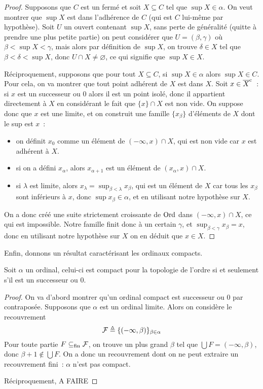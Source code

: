 \begin{proof}
  Supposons que $C$ est un fermé et soit $X\subseteq C$ tel que
  $\sup X \in \alpha$. On veut montrer que $\sup X$ est dans l'adhérence de $C$
  (qui est $C$ lui-même par hypothèse). Soit $U$ un ouvert contenant
  $\sup X$, sans perte de généralité (quitte à prendre une plus petite partie)
  on peut considérer que $U = (\beta, \gamma)$ où $\beta < \sup X < \gamma$,
  mais alors par définition de $\sup X$, on trouve $\delta \in X$ tel que
  $\beta < \delta < \sup X$, donc $U \cap X \neq\varnothing$, ce qui signifie
  que $\sup X \in X$.

  Réciproquement, supposons que pour tout $X\subseteq C$, si $\sup X \in \alpha$
  alors $\sup X \in C$. Pour cela, on va montrer que tout point adhérent de
  $X$ est dans $X$. Soit $x \in \overline{X}^{\mathrm c}$~: si $x$ est un successeur ou $0$
  alors il est un point isolé, donc il appartient directement à $X$ en
  considérant le fait que $\{x\}\cap X$ est non vide. On suppose donc que
  $x$ est une limite, et on construit une famille $\{x_\beta\}$ d'éléments de
  $X$ dont le sup est $x$~:
  \begin{itemize}
  \item on définit $x_0$ comme un élément de $(-\infty, x)\cap X$, qui est non
    vide car $x$ est adhérent à $X$.
  \item si on a défini $x_\alpha$, alors $x_{\alpha + 1}$ est un élément de
    $(x_\alpha,x)\cap X$.
  \item si $\lambda$ est limite, alors
    $x_{\lambda}=\sup_{\beta < \lambda}x_\beta$, qui est un élément de $X$ car
    tous les $x_\beta$ sont inférieurs à $x$, donc $\sup x_\beta\in \alpha$,
    et en utilisant notre hypothèse sur $X$.
  \end{itemize}
  On a donc créé une suite strictement croissante de $\operatorname{Ord}$ dans
  $(-\infty,x)\cap X$, ce qui est impossible. Notre famille finit donc à un
  certain $\gamma$, et $\sup_{\beta < \gamma} x_\beta = x$, donc en utilisant
  notre hypothèse sur $X$ on en déduit que $x\in X$.
\end{proof}

Enfin, donnons un résultat caractérisant les ordinaux compacts.

\begin{proposition}
  Soit $\alpha$ un ordinal, celui-ci est compact pour la topologie de l'ordre si
  et seulement s'il est un successeur ou $0$.
\end{proposition}

\begin{proof}
  On va d'abord montrer qu'un ordinal compact est successeur ou $0$ par
  contraposée. Supposons que $\alpha$ est un ordinal limite. Alors on considère
  le recouvrement
  \[\mathcal F \triangleq \{(-\infty,\beta)\}_{\beta \in \alpha}\]
  Pour toute partie $F\subseteq_{\mathrm{fin}}\mathcal F$, on trouve un plus grand $\beta$ tel
  que $\bigcup F = (-\infty,\beta)$, donc $\beta + 1 \notin\bigcup F$. On a
  donc un recouvrement dont on ne peut extraire un recouvrement fini~: $\alpha$
  n'est pas compact.

  Réciproquement, A FAIRE
\end{proof}

